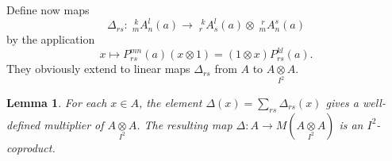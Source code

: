 \documentclass[12pt]{article}
\theoremstyle{change}
\newcommand{\Gr}[5]{\;{}^{\;#2}_{#4}#1_{#5}^{#3}}%
\newcommand{\itimes}{\underset{I^2}{\otimes}}
\newtheorem{Lem}[Theorem]{Lemma}
\theoremstyle{definition}
\numberwithin{equation}{section}
\begin{document}



Define now maps \[\Delta_{rs}: \Gr{A}{k}{l}{m}{n}(a) \rightarrow \Gr{A}{k}{l}{r}{s}(a)\otimes \Gr{A}{r}{s}{m}{n}(a)\] by the application \[x \mapsto P_{rs}^{mn}(a) (x\otimes 1) = (1\otimes x)P_{rs}^{kl}(a).\] They obviously extend to linear maps $\Delta_{rs}$ from $A$ to $A\itimes A$.

\begin{Lem} For each $x\in A$, the element $\Delta(x) = \sum_{rs}\Delta_{rs}(x)$ gives a well-defined multiplier of $A\itimes A$. The resulting map $\Delta: A\rightarrow M(A\itimes A)$ is an $I^2$-coproduct.
\end{Lem}
\end{document}
